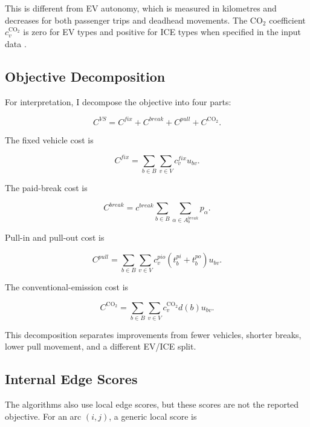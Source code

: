 This is different from EV autonomy, which is measured in kilometres and
decreases for both passenger trips and deadhead movements.
The CO\(_2\) coefficient \(c_v^{\mathrm{CO}_2}\) is zero for EV types and positive for ICE
types when specified in the input data \cite{minoa-problem,minoa-io}.

\subsection{Objective Decomposition}

For interpretation, I decompose the objective into four parts:

\begin{equation}
C^{VS}
=
C^{fix}+C^{break}+C^{pull}+C^{\mathrm{CO}_2}.
\label{eq:cost-decomposition}
\end{equation}

The fixed vehicle cost is

\begin{equation}
C^{fix}
=
\sum_{b\in B}\sum_{v\in V}c_v^{fix}u_{bv}.
\label{eq:fixed-cost}
\end{equation}

The paid-break cost is

\begin{equation}
C^{break}
=
c^{break}\sum_{b\in B}\sum_{\alpha\in A_b^{break}} p_\alpha.
\label{eq:break-cost}
\end{equation}

Pull-in and pull-out cost is

\begin{equation}
C^{pull}
=
\sum_{b\in B}
\sum_{v\in V}
c_v^{pio}
\left(t_b^{pi}+t_b^{po}\right)
u_{bv}.
\label{eq:pull-cost}
\end{equation}

The conventional-emission cost is

\begin{equation}
C^{\mathrm{CO}_2}
=
\sum_{b\in B}
\sum_{v\in V}
c_v^{\mathrm{CO}_2}d(b)u_{bv}.
\label{eq:co2-cost}
\end{equation}

This decomposition separates improvements from fewer vehicles, shorter breaks,
lower pull movement, and a different EV/ICE split.

\subsection{Internal Edge Scores}

The algorithms also use local edge scores, but these scores are not the
reported objective. For an arc \((i,j)\), a generic local score is

